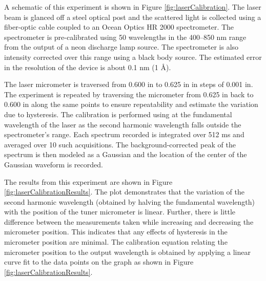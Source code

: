 A schematic of this experiment is shown in Figure \ref{fig:laserCalibration}.
The laser beam is glanced off a steel optical post and the scattered light is collected using a fiber-optic cable coupled to an Ocean Optics HR 2000 spectrometer.
The spectrometer is pre-calibrated using 50 wavelengths in the 400--850 nm range from the output of a neon discharge lamp source.
The spectrometer is also intensity corrected over this range using a black body source.
The estimated error in the resolution of the device is about 0.1 nm (1 \AA).

The laser micrometer is traversed from 0.600 in to 0.625 in in steps of 0.001 in.
The experiment is repeated by traversing the micrometer from 0.625 in back to 0.600 in along the same points to ensure repeatability and estimate the variation due to hysteresis.
The calibration is performed using at the fundamental wavelength of the laser as the second harmonic wavelength falls outside the spectrometer's range.
Each spectrum recorded is integrated over 512 ms and averaged over 10 such acquisitions.
The background-corrected peak of the spectrum is then modeled as a Gaussian and the location of the center of the Gaussian waveform is recorded.



The results from this experiment are shown in Figure \ref{fig:laserCalibrationResults}.
The plot demonstrates that the variation of the second harmonic wavelength (obtained by halving the fundamental wavelength) with the position of the tuner micrometer is linear.
Further, there is little difference between the measurements taken while increasing and decreasing the micrometer position.
This indicates that any effects of hysteresis in the micrometer position are minimal.
The calibration equation relating the micrometer position to the output wavelength is obtained by applying a linear curve fit to the data points on the graph as shown in Figure \ref{fig:laserCalibrationResults}.

